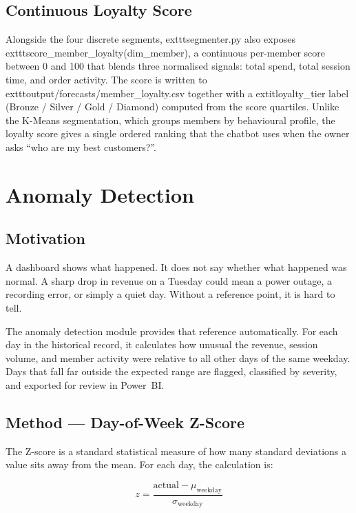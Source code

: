 \subsection{Continuous Loyalty Score}

Alongside the four discrete segments, 	exttt{segmenter.py} also exposes
	exttt{score\_member\_loyalty(dim\_member)}, a continuous per-member score
between 0 and 100 that blends three normalised signals: total spend, total
session time, and order activity. The score is written to
	exttt{output/forecasts/member\_loyalty.csv} together with a
	extit{loyalty\_tier} label (Bronze / Silver / Gold / Diamond) computed from
the score quartiles. Unlike the K-Means segmentation, which groups members by
behavioural profile, the loyalty score gives a single ordered ranking that the
chatbot uses when the owner asks ``who are my best customers?''.

\section{Anomaly Detection}

\subsection{Motivation}

A dashboard shows what happened. It does not say whether what happened was normal.
A sharp drop in revenue on a Tuesday could mean a power outage, a recording error, or
simply a quiet day. Without a reference point, it is hard to tell.

The anomaly detection module provides that reference automatically. For each day in
the historical record, it calculates how unusual the revenue, session volume, and
member activity were relative to all other days of the same weekday. Days that fall
far outside the expected range are flagged, classified by severity, and exported for
review in Power~BI.

\subsection{Method --- Day-of-Week Z-Score}

The Z-score is a standard statistical measure of how many standard deviations a value
sits away from the mean. For each day, the calculation is:

\[
  z = \frac{\text{actual} - \mu_{\text{weekday}}}{\sigma_{\text{weekday}}}
\]

